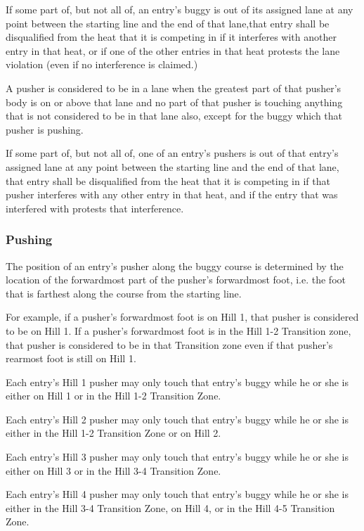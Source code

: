 \documentclass[openany]{book}
\begin{document}
If some part of, but not all of, an entry's buggy is out of its assigned lane at any point between the starting line and the end of that lane,that entry shall be disqualified from the heat that it is competing in if it interferes with another entry in that heat, or if one of the other entries in that heat protests the lane violation (even if no interference is claimed.)

A pusher is considered to be in a lane when the greatest part of that pusher's body is on or above that lane and no part of that pusher is touching anything that is not considered to be in that lane also, except for the buggy which that pusher is pushing.

If some part of, but not all of, one of an entry's pushers is out of that entry's assigned lane at any point between the starting line and the end of that lane, that entry shall be disqualified from the heat that it is competing in if that pusher interferes with any other entry in that heat, and if the entry that was interfered with protests that interference.

\subsubsection{Pushing}

The position of an entry's pusher along the buggy course is determined by the location of the forwardmost part of the pusher's forwardmost foot, i.e. the foot that is farthest along the course from the starting line.

For example, if a pusher's forwardmost foot is on Hill 1, that pusher is considered to be on Hill 1. If a pusher's forwardmost foot is in the Hill 1-2 Transition zone, that pusher is considered to be in that Transition zone even if that pusher's rearmost foot is still on Hill 1.

Each entry's Hill 1 pusher may only touch that entry's buggy while he or she is either on Hill 1 or in the Hill 1-2 Transition Zone.

Each entry's Hill 2 pusher may only touch that entry's buggy while he or she is either in the Hill 1-2 Transition Zone or on Hill 2.

Each entry's Hill 3 pusher may only touch that entry's buggy while he or she is either on Hill 3 or in the Hill 3-4 Transition Zone.

Each entry's Hill 4 pusher may only touch that entry's buggy while he or she is either in the Hill 3-4 Transition Zone, on Hill 4, or in the Hill 4-5 Transition Zone.
\end{document}
